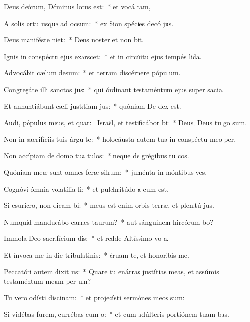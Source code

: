 \item Deus deórum, Dóminus lotus est:~* et vocá ram,
\item A solis ortu usque ad ocsum:~* ex Sion spécies decó jus.
\item Deus maniféste niet:~* Deus noster et non bit.
\item Ignis in conspéctu ejus exarscet:~* et in circúitu ejus tempés lida.
\item Advocábit cælum desum:~* et terram discérnere pópu um.
\item Congregáte illi sanctos jus:~* qui órdinant testaméntum ejus super sacia.
\item Et annuntiábunt cæli justítiam jus:~* quóniam De dex est.
\item Audi, pópulus meus, et quar:~\pscross{} Israël, et testificábor bi:~* Deus, Deus tu go sum.
\item Non in sacrifíciis tuis árgu te:~* holocáusta autem tua in conspéctu meo  per.
\item Non accípiam de domo tua tulos:~* neque de grégibus tu cos.
\item Quóniam meæ sunt omnes feræ silrum:~* juménta in móntibus  ves.
\item Cognóvi ómnia volatília li:~* et pulchritúdo a cum est.
\item Si esuríero, non dicam bi:~* meus est enim orbis terræ, et plenitú jus.
\item Numquid manducábo carnes taurum?~* aut sánguinem hircórum bo?
\item Immola Deo sacrifícium dis:~* et redde Altíssimo vo a.
\item Et ínvoca me in die tribulatinis:~* éruam te, et honoribis me.
\item Peccatóri autem dixit us:~* Quare tu enárras justítias meas, et assúmis testaméntum meum per  um?
\item Tu vero odísti discinam:~* et projecísti sermónes meos sum:
\item Si vidébas furem, currébas cum o:~* et cum adúlteris portiónem tuam bas.
